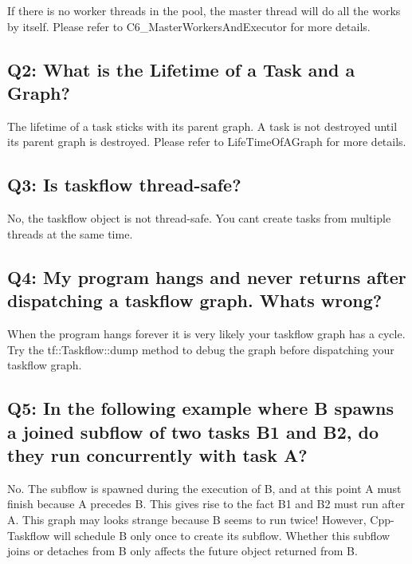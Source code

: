 If there is no worker threads in the pool, the master thread will do all the works by itself. Please refer to C6\+\_\+\+Master\+Workers\+And\+Executor for more details.\hypertarget{FAQ_ProgrammingQuestions2}{}\subsection{Q2\+: What is the Lifetime of a Task and a Graph?}\label{FAQ_ProgrammingQuestions2}
The lifetime of a task sticks with its parent graph. A task is not destroyed until its parent graph is destroyed. Please refer to Life\+Time\+Of\+A\+Graph for more details.\hypertarget{FAQ_ProgrammingQuestions3}{}\subsection{Q3\+: Is taskflow thread-\/safe?}\label{FAQ_ProgrammingQuestions3}
No, the taskflow object is not thread-\/safe. You can\textquotesingle{}t create tasks from multiple threads at the same time.\hypertarget{FAQ_ProgrammingQuestions4}{}\subsection{Q4\+: My program hangs and never returns after dispatching a taskflow graph. What\textquotesingle{}s wrong?}\label{FAQ_ProgrammingQuestions4}
When the program hangs forever it is very likely your taskflow graph has a cycle. Try the tf\+::\+Taskflow\+::dump method to debug the graph before dispatching your taskflow graph.\hypertarget{FAQ_ProgrammingQuestions5}{}\subsection{Q5\+: In the following example where B spawns a joined subflow of two tasks B1 and B2, do they run concurrently with task A?}\label{FAQ_ProgrammingQuestions5}


No. The subflow is spawned during the execution of B, and at this point A must finish because A precedes B. This gives rise to the fact B1 and B2 must run after A. This graph may looks strange because B seems to run twice! However, Cpp-\/\+Taskflow will schedule B only once to create its subflow. Whether this subflow joins or detaches from B only affects the future object returned from B. 